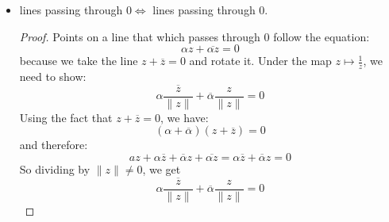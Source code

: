 \documentclass{article}
\begin{document}
\begin{itemize}
        \item lines passing through $0 \iff$ lines passing through $0$. 
            \begin{proof}
                Points on a line that which passes through $0$ follow the equation:
                    \begin{equation*}
                        \alpha z + \overline{\alpha z} = 0
                    \end{equation*}
                because we take the line $z + \overline{z} = 0$ and rotate it. Under the map $z \mapsto \frac{1}{z}$, we need to show:
                    \begin{equation*}
                        \alpha \dfrac{\overline{z}}{\lVert z \rVert} + \overline{\alpha}\dfrac{z}{\lVert z \rVert} = 0
                    \end{equation*}
                Using the fact that $z + \overline{z} = 0$, we have:
                    \begin{equation*}
                        (\alpha + \overline{\alpha})(z + \overline{z}) = 0
                    \end{equation*}
                and therefore:
                    \begin{equation*}
                        az + \alpha\overline{z} + \overline{\alpha}z + \overline{\alpha z} = \alpha \overline{z} + \overline{\alpha}z = 0
                    \end{equation*}
                So dividing by $\lVert z \rVert \neq 0$, we get
                    \begin{equation*}
                        \alpha\dfrac{\overline{z}}{\lVert z \rVert} + \overline{\alpha}\dfrac{z}{\lVert z \rVert} = 0
                    \end{equation*}
            \end{proof}
    \end{itemize}

\newpage
\end{document}
